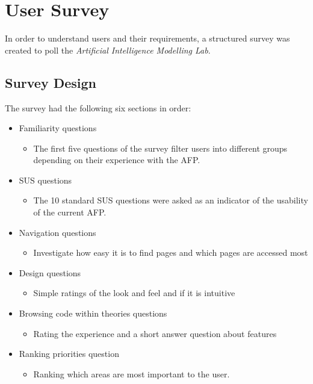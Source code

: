 \documentclass[frontabs,bsc,singlespacing,parskip,deptreport]{infthesis}
\begin{document}
\chapter{User Survey}

In order to understand users and their requirements, a structured survey was created to poll the \textit{Artificial Intelligence Modelling Lab}. 

\section{Survey Design}

The survey had the following six sections in order: 

\begin{itemize}
  \item Familiarity questions
  \begin{itemize}
    \item The first five questions of the survey filter users into different groups depending on their experience with the AFP.
  \end{itemize}
  \item SUS questions
  \begin{itemize}
    \item The 10 standard SUS questions were asked as an indicator of the usability of the current AFP. 
  \end{itemize}
  \item Navigation questions
  \begin{itemize}
    \item Investigate how easy it is to find pages and which pages are accessed most
  \end{itemize}
  \item Design questions
  \begin{itemize}
    \item Simple ratings of the look and feel and if it is intuitive
  \end{itemize}
  \item Browsing code within theories questions
  \begin{itemize}
    \item Rating the experience and a short answer question about features
  \end{itemize}
  \item Ranking priorities question
  \begin{itemize}
    \item Ranking which areas are most important to the user.
  \end{itemize}
\end{itemize}
\end{document}

